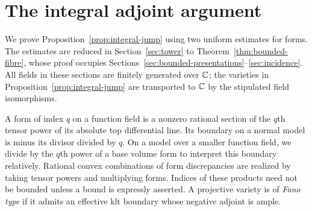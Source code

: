 \section{The integral adjoint argument}
\label{sec:integral-jump}

We prove Proposition~\ref{prop:integral-jump} using two uniform
estimates for forms.  The estimates are reduced in
Section~\ref{sec:tower} to Theorem~\ref{thm:bounded-fibre}, whose proof
occupies Sections~\ref{sec:bounded-presentations}--\ref{sec:incidence}.
All fields in these sections are finitely generated over $\mathbb C$; the
varieties in Proposition~\ref{prop:integral-jump} are transported to
$\mathbb C$ by the stipulated field isomorphisms.

A form of index $q$ on a function field is a nonzero rational section
of the $q$th tensor power of its absolute top differential line.
Its boundary on a normal model is minus its divisor divided by $q$.
On a model over a smaller function field, we divide by the $q$th
power of a base volume form to interpret this boundary relatively.
Rational convex combinations of form discrepancies are realized by
taking tensor powers and multiplying forms.  Indices of these
products need not be bounded unless a bound is expressly asserted.
A projective variety is of \emph{Fano type} if it admits an effective
klt boundary whose negative adjoint is ample.

